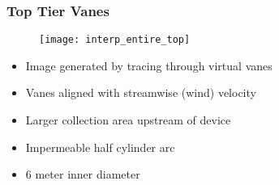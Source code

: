 \documentclass[mathserif]{beamer}
\begin{document}
\begin{frame}
 \frametitle{Top Tier Vanes}
    \begin{figure}[htb]
     \centering
     \texttt{[image: interp\_entire\_top]}
    \end{figure}


   
 
 \begin{block}{}
  \begin{itemize}
   \item Image generated by tracing through virtual vanes
   \item Vanes aligned with streamwise (wind) velocity
   \item Larger collection area upstream of device
   \item Impermeable half cylinder arc
   \item 6 meter inner diameter
  \end{itemize}
 \end{block}
\end{frame}
\end{document}
